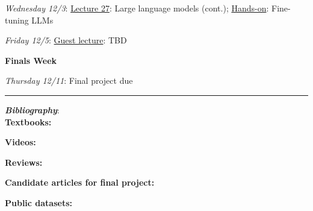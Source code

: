 \documentclass[12pt]{article}
\begin{document}
\emph{Wednesday 12/3}: \underline{Lecture 27}: Large language models (cont.); \underline{Hands-on}: Fine-tuning LLMs

\emph{Friday 12/5}: \underline{Guest lecture}: TBD

\noindent\textbf{Finals Week}

\emph{Thursday 12/11}: Final project due

\begin{center}
	\rule{\textwidth}{0.5pt}
\end{center}

\noindent\textbf{\emph{Bibliography}}:\\

\textbf{Textbooks:}

\newrefsection
\nocite{Mehta:2019,Abu-Mostafa:2012,Erdman:2021,Zeljko:2014,Calafiura:2022,Chollet:2021,Goodfellow-et-al-2016}
\printbibliography[heading=none]

\textbf{Videos:}

\newrefsection
\nocite{3blue1brown_neuralnetwork,3blue1brown_gradientdescent}
\printbibliography[heading=none]

\textbf{Reviews:}

\newrefsection
\nocite{Carleo:2019ptp,hepmllivingreview,ParticleDataGroup:2024cfk}
\printbibliography[heading=none]

\textbf{Candidate articles for final project:}

\newrefsection
\nocite{deOliveira:2015xxd,Aurisano:2016jvx,Komiske:2016rsd,Khan:2018opv,Zhou:2019,Moreno:2019neq,Ormiston:2020ele,Moreno:2021fvp,Erdmann:2019nie,Guest:2016iqz,Majorana:2023kmv,Fry:2024lcg,Miao:2024oqy,Li:2024htp,LSSTDarkEnergyScience:2019cvx}
\printbibliography[heading=none]

\textbf{Public datasets:}

\newrefsection
\nocite{kasieczka_gregor_2019_2603256,hbb_dataset,galaxy-zoo-the-galaxy-challenge,g2net-gravitational-wave-detection,trackml-particle-identification,majorana_collaboration_2023_8257027,jetclass,jetclass2,plasticc-kaggle}
\printbibliography[heading=none]
\end{document}
